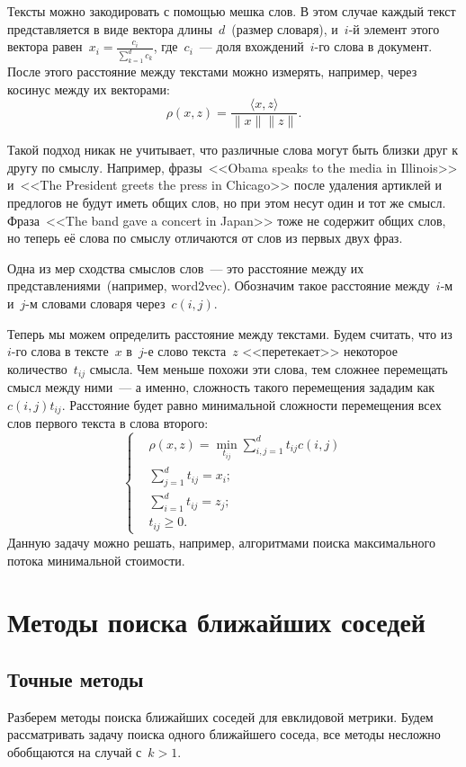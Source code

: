 \documentclass[12pt,fleqn]{article}
\begin{document}
Тексты можно закодировать с помощью мешка слов.
В этом случае каждый текст представляется
в виде вектора длины~$d$~(размер словаря), и~$i$-й элемент этого вектора равен~$x_i = \frac{c_i}{\sum_{k = 1}^{d} c_k}$,
где~$c_i$~--- доля вхождений~$i$-го слова в документ.
После этого расстояние между текстами можно измерять, например, через косинус между их векторами:
\[
    \rho(x, z)
    =
    \frac{
        \langle x, z \rangle
    }{
        \|x\| \|z\|
    }.
\]

Такой подход никак не учитывает, что различные слова могут быть близки друг к другу по смыслу.
Например, фразы~<<Obama speaks to the media in Illinois>> и~<<The President greets the press in Chicago>>
после удаления артиклей и предлогов не будут иметь общих слов, но при этом несут один и тот же смысл.
Фраза~<<The band gave a concert in Japan>> тоже не содержит общих слов, но теперь
её слова по смыслу отличаются от слов из первых двух фраз.

Одна из мер сходства смыслов слов~--- это расстояние между их представлениями~(например, word2vec).
Обозначим такое расстояние между~$i$-м и~$j$-м словами словаря через~$c(i, j)$.

Теперь мы можем определить расстояние между текстами.
Будем считать, что из~$i$-го слова в тексте~$x$ в~$j$-е слово текста~$z$ <<перетекает>> некоторое количество~$t_{ij}$ смысла.
Чем меньше похожи эти слова, тем сложнее перемещать смысл между ними~--- а именно, сложность такого перемещения
зададим как~$c(i, j) t_{ij}$.
Расстояние будет равно минимальной сложности перемещения всех слов первого текста в слова второго:
\[
    \left\{
    \begin{aligned}
        &\rho(x, z) = \min_{t_{ij}} \sum_{i, j = 1}^{d} t_{ij} c(i, j) \\
        &\sum_{j = 1}^{d} t_{ij} = x_i; \\
        &\sum_{i = 1}^{d} t_{ij} = z_j; \\
        &t_{ij} \geq 0.
    \end{aligned}
    \right.
\]
Данную задачу можно решать, например, алгоритмами поиска максимального потока минимальной стоимости.

\section{Методы поиска ближайших соседей}
\subsection{Точные методы}
Разберем методы поиска ближайших соседей для евклидовой метрики.
Будем рассматривать задачу поиска одного ближайшего соседа,
все методы несложно обобщаются на случай с~$k > 1$.
\end{document}

